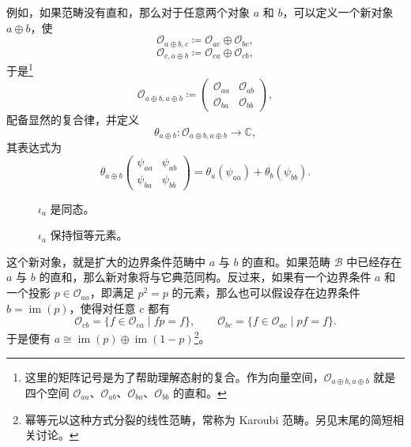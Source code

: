 例如，如果范畴没有直和，那么对于任意两个对象 $a$ 和 $b$，可以定义一个新对象 $a\oplus b$，使
\begin{equation}\label{eq:2.13}
\mathcal{O}_{a\oplus b,c}\coloneqq\mathcal{O}_{ac}\oplus\mathcal{O}_{bc},
\end{equation}
\begin{equation}\label{eq:2.14}
\mathcal{O}_{c,a\oplus b}\coloneqq\mathcal{O}_{ca}\oplus\mathcal{O}_{cb},
\end{equation}
于是\footnote{这里的矩阵记号是为了帮助理解态射的复合。作为向量空间，$\mathcal{O}_{a\oplus b,a\oplus b}$ 就是四个空间 $\mathcal{O}_{aa}$、$\mathcal{O}_{ab}$、$\mathcal{O}_{ba}$、$\mathcal{O}_{bb}$ 的直和。}
\begin{equation}\label{eq:2.15}
\mathcal{O}_{a\oplus b,a\oplus b}\coloneqq
\begin{pmatrix}\mathcal{O}_{aa}&\mathcal{O}_{ab}\\\mathcal{O}_{ba}&\mathcal{O}_{bb}\end{pmatrix},
\end{equation}
配备显然的复合律，并定义
\begin{equation}\label{eq:2.16}
\theta_{a\oplus b}\colon\mathcal{O}_{a\oplus b,a\oplus b}\longrightarrow\mathbb{C},
\end{equation}
其表达式为
\begin{equation}\label{eq:2.17}
\theta_{a\oplus b}\begin{pmatrix}\psi_{aa}&\psi_{ab}\\\psi_{ba}&\psi_{bb}\end{pmatrix}
=\theta_a(\psi_{aa})+\theta_b(\psi_{bb}).
\end{equation}

\begin{figure}[H]
\centering
{}
\caption{$\iota_a$ 是同态。}\label{fig:2.7}
\end{figure}

\begin{figure}[H]
\centering
{}
\caption{$\iota_a$ 保持恒等元素。}\label{fig:2.8}
\end{figure}

这个新对象，就是扩大的边界条件范畴中 $a$ 与 $b$ 的直和。如果范畴 $\mathcal{B}$ 中已经存在 $a$ 与 $b$ 的直和，那么新对象将与它典范同构。反过来，如果有一个边界条件 $a$ 和一个投影 $p\in\mathcal{O}_{aa}$，即满足 $p^2=p$ 的元素，那么也可以假设存在边界条件 $b=\operatorname{im}(p)$，使得对任意 $c$ 都有
\[
\mathcal{O}_{cb}=\{f\in\mathcal{O}_{ca}\mid fp=f\},\qquad
\mathcal{O}_{bc}=\{f\in\mathcal{O}_{ac}\mid pf=f\}.
\]
于是便有 $a\cong\operatorname{im}(p)\oplus\operatorname{im}(1-p)$\footnote{幂等元以这种方式分裂的线性范畴，常称为 Karoubi 范畴。另见末尾的简短相关讨论。}。

